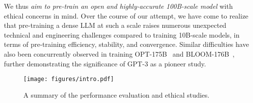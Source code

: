 We thus \textit{aim to pre-train an open and highly-accurate 100B-scale model} with ethical concerns in mind. 
Over the course of our attempt, we have come to realize that pre-training a dense LLM at such a scale raises numerous unexpected technical and engineering challenges compared to training 10B-scale models, in terms of pre-training efficiency, stability, and convergence.  
Similar difficulties have also been concurrently observed in training OPT-175B~\citep{zhang2022opt} and BLOOM-176B~\citep{scao2022what}, further demonstrating the significance of GPT-3 as a pioneer study. 

\begin{figure}[t]
    \centering
    \vspace{-4mm}
    \texttt{[image: figures/intro.pdf]}
    \vspace{-4mm}
    \caption{A summary of the performance evaluation 
    and ethical studies.}
    \label{fig:intro}
    \vspace{-4mm}
\end{figure}

